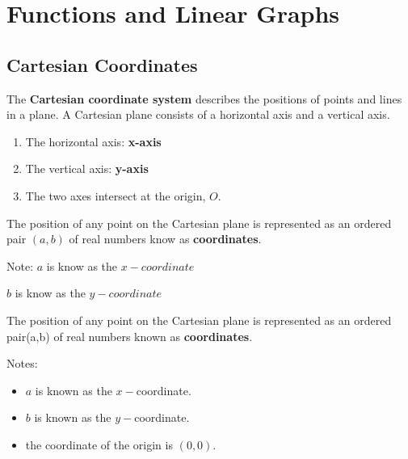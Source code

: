\documentclass[../main]{subfiles}
\begin{document}
\section{Functions and Linear Graphs}

\subsection{Cartesian Coordinates}

The \textbf{Cartesian coordinate system} describes the positions of points and
lines in a plane. A Cartesian plane consists of a horizontal axis and a vertical
axis.
\begin{enumerate}
\item The horizontal axis: \textbf{x-axis}
\item  The vertical axis: \textbf{y-axis}
\item The two axes intersect at the origin, \(O\).

\end{enumerate}

The position of any point on the Cartesian plane is represented as an ordered
pair \((a,b)\) of real numbers know as \textbf{coordinates}.

Note:
\(a\) is know as the \(x-coordinate\)

\(b\) is know as the \(y-coordinate\)


The position of any point on the Cartesian plane is represented as an ordered
pair(a,b) of real numbers known as \textbf{coordinates}.


Notes:
\begin{itemize}
\item \(a\) is known as the \(x-\)coordinate.
\item \(b\) is known as the \(y-\)coordinate.
\item the coordinate of the origin is \((0,0)\).
\end{itemize}
\end{document}
